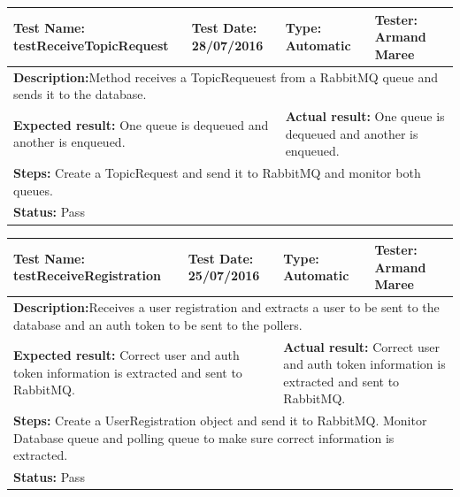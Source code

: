 \documentclass[hidelinks,english]{article}
\begin{document}
				\begin{center}
					\begin{tabular}{p{4cm} p{4cm} p{4cm} p{4cm}}
					\hline
					\multicolumn{1}{L{4cm}}{\textbf{Test Name:} testReceiveTopicRequest} & \multicolumn{1}{L{4cm}}{\textbf{Test Date:} 28/07/2016} & \multicolumn{1}{L{4cm}}{\textbf{Type:} Automatic} & \multicolumn{1}{L{4cm}}{\textbf{Tester:} Armand Maree} \\ \hline \hline
					\multicolumn{4}{L{16cm}}{\textbf{Description:}Method receives a TopicRequeuest from a RabbitMQ queue and sends it to the database.} \\
					\multicolumn{2}{L{8cm}}{\textbf{Expected result:} One queue is dequeued and another is enqueued.} & \multicolumn{2}{L{8cm}}{\textbf{Actual result:} One queue is dequeued and another is enqueued.} \\ \multicolumn{4}{L{16cm}}{\textbf{Steps:} Create a TopicRequest and send it to RabbitMQ and monitor both queues.} \\
					\multicolumn{4}{L{16cm}}{\textbf{Status:} Pass}\\ \hline
					\end{tabular}
				\end{center}
				
				\begin{center}
					\begin{tabular}{p{4cm} p{4cm} p{4cm} p{4cm}}
					\hline
					\multicolumn{1}{L{4cm}}{\textbf{Test Name:} testReceiveRegistration} & \multicolumn{1}{L{4cm}}{\textbf{Test Date:} 25/07/2016} & \multicolumn{1}{L{4cm}}{\textbf{Type:} Automatic} & \multicolumn{1}{L{4cm}}{\textbf{Tester:} Armand Maree} \\ \hline \hline
					\multicolumn{4}{L{16cm}}{\textbf{Description:}Receives a user registration and extracts a user to be sent to the database and an auth token to be sent to the pollers.} \\
					\multicolumn{2}{L{8cm}}{\textbf{Expected result:} Correct user and auth token information is extracted and sent to RabbitMQ.} & \multicolumn{2}{L{8cm}}{\textbf{Actual result:} Correct user and auth token information is extracted and sent to RabbitMQ.} \\ \multicolumn{4}{L{16cm}}{\textbf{Steps:} Create a UserRegistration object and send it to RabbitMQ. Monitor Database queue and polling queue to make sure correct information is extracted.} \\
					\multicolumn{4}{L{16cm}}{\textbf{Status:} Pass}\\ \hline
					\end{tabular}
				\end{center}
				
\end{document}
